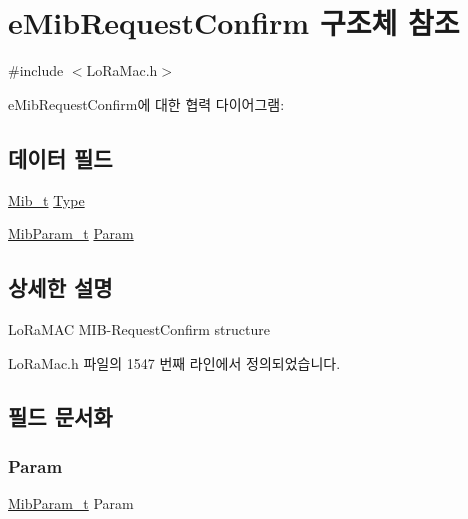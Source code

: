 \hypertarget{structe_mib_request_confirm}{}\section{e\+Mib\+Request\+Confirm 구조체 참조}
\label{structe_mib_request_confirm}


{\ttfamily \#include $<$Lo\+Ra\+Mac.\+h$>$}



e\+Mib\+Request\+Confirm에 대한 협력 다이어그램\+:
\subsection*{데이터 필드}
\begin{DoxyCompactItemize}
\item 
\mbox{\hyperlink{group___l_o_r_a_m_a_c_gaf17bd3de9ec75e4954be9a070cd8ddf9}{Mib\+\_\+t}} \mbox{\hyperlink{structe_mib_request_confirm_ada1f9249fb28125c69bdfacfaeeae0e2}{Type}}
\item 
\mbox{\hyperlink{group___l_o_r_a_m_a_c_gae9f2411f44447849f5b36bcaca1feb5c}{Mib\+Param\+\_\+t}} \mbox{\hyperlink{structe_mib_request_confirm_afb8c77b3200d879d36beed691fb71f8d}{Param}}
\end{DoxyCompactItemize}


\subsection{상세한 설명}
Lo\+Ra\+M\+AC M\+I\+B-\/\+Request\+Confirm structure 

Lo\+Ra\+Mac.\+h 파일의 1547 번째 라인에서 정의되었습니다.



\subsection{필드 문서화}
\mbox{\label{structe_mib_request_confirm_afb8c77b3200d879d36beed691fb71f8d}} 
\subsubsection{\texorpdfstring{Param}{Param}}
{\footnotesize\ttfamily \mbox{\hyperlink{group___l_o_r_a_m_a_c_gae9f2411f44447849f5b36bcaca1feb5c}{Mib\+Param\+\_\+t}} Param}

